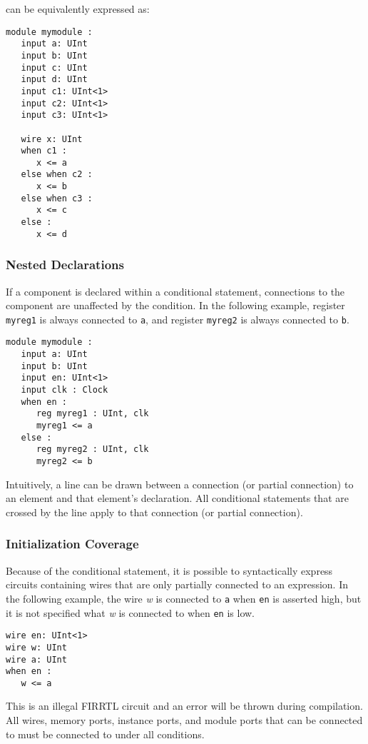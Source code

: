 \documentclass[12pt]{article}
\begin{document}
can be equivalently expressed as:

\begin{verbatim}
module mymodule :
   input a: UInt
   input b: UInt
   input c: UInt
   input d: UInt
   input c1: UInt<1>
   input c2: UInt<1>
   input c3: UInt<1>

   wire x: UInt
   when c1 :
      x <= a
   else when c2 :
      x <= b
   else when c3 :
      x <= c  
   else :
      x <= d       
\end{verbatim}

\subsubsection{Nested Declarations}
If a component is declared within a conditional statement, connections to the component are unaffected by the condition. In the following example, register \verb|myreg1| is always connected to \verb|a|, and register \verb|myreg2| is always connected to \verb|b|.

\begin{verbatim}
module mymodule :
   input a: UInt
   input b: UInt
   input en: UInt<1>
   input clk : Clock
   when en :
      reg myreg1 : UInt, clk
      myreg1 <= a
   else :
      reg myreg2 : UInt, clk
      myreg2 <= b
\end{verbatim}

Intuitively, a line can be drawn between a connection (or partial connection) to an element and that element's declaration. All conditional statements that are crossed by the line apply to that connection (or partial connection).

\subsubsection{Initialization Coverage}
Because of the conditional statement, it is possible to syntactically express circuits containing wires that are only partially connected to an expression. In the following example, the wire {\em w} is connected to \verb|a| when \verb|en| is asserted high, but it is not specified what {\em w} is connected to when \verb|en| is low.

\begin{verbatim}
wire en: UInt<1>
wire w: UInt
wire a: UInt
when en :
   w <= a
\end{verbatim}

This is an illegal FIRRTL circuit and an error will be thrown during compilation. All wires, memory ports, instance ports, and module ports that can be connected to must be connected to under all conditions.
\end{document}
